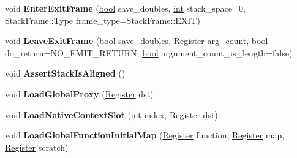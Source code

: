 \begin{DoxyCompactItemize}
\item 
\mbox{\label{classv8_1_1internal_1_1MacroAssembler_ab0efeeb5ce8ac90b32ce83e0c66b00d7}} 
void {\bfseries Enter\+Exit\+Frame} (\mbox{\hyperlink{classbool}{bool}} save\+\_\+doubles, \mbox{\hyperlink{classint}{int}} stack\+\_\+space=0, Stack\+Frame\+::\+Type frame\+\_\+type=Stack\+Frame\+::\+E\+X\+IT)
\item 
\mbox{\label{classv8_1_1internal_1_1MacroAssembler_a0759408b62c9c70233c985bcc1e57b44}} 
void {\bfseries Leave\+Exit\+Frame} (\mbox{\hyperlink{classbool}{bool}} save\+\_\+doubles, \mbox{\hyperlink{classv8_1_1internal_1_1Register}{Register}} arg\+\_\+count, \mbox{\hyperlink{classbool}{bool}} do\+\_\+return=N\+O\+\_\+\+E\+M\+I\+T\+\_\+\+R\+E\+T\+U\+RN, \mbox{\hyperlink{classbool}{bool}} argument\+\_\+count\+\_\+is\+\_\+length=false)
\item 
\mbox{\label{classv8_1_1internal_1_1MacroAssembler_a5b604d2f2df7820700ef88a5057f3047}} 
void {\bfseries Assert\+Stack\+Is\+Aligned} ()
\item 
\mbox{\label{classv8_1_1internal_1_1MacroAssembler_a8139c3ce1dd60f65909755011ef7f9d1}} 
void {\bfseries Load\+Global\+Proxy} (\mbox{\hyperlink{classv8_1_1internal_1_1Register}{Register}} dst)
\item 
\mbox{\label{classv8_1_1internal_1_1MacroAssembler_abb9c73f938328171318c7cc010a7b53c}} 
void {\bfseries Load\+Native\+Context\+Slot} (\mbox{\hyperlink{classint}{int}} index, \mbox{\hyperlink{classv8_1_1internal_1_1Register}{Register}} dst)
\item 
\mbox{\label{classv8_1_1internal_1_1MacroAssembler_a5efc6835edac830cc68f3b37607de867}} 
void {\bfseries Load\+Global\+Function\+Initial\+Map} (\mbox{\hyperlink{classv8_1_1internal_1_1Register}{Register}} function, \mbox{\hyperlink{classv8_1_1internal_1_1Register}{Register}} map, \mbox{\hyperlink{classv8_1_1internal_1_1Register}{Register}} scratch)
\item 
\mbox{\label{classv8_1_1internal_1_1MacroAssembler_a45a3612fb3be7000eb94309ac385674b}} 

\end{DoxyCompactItemize}

